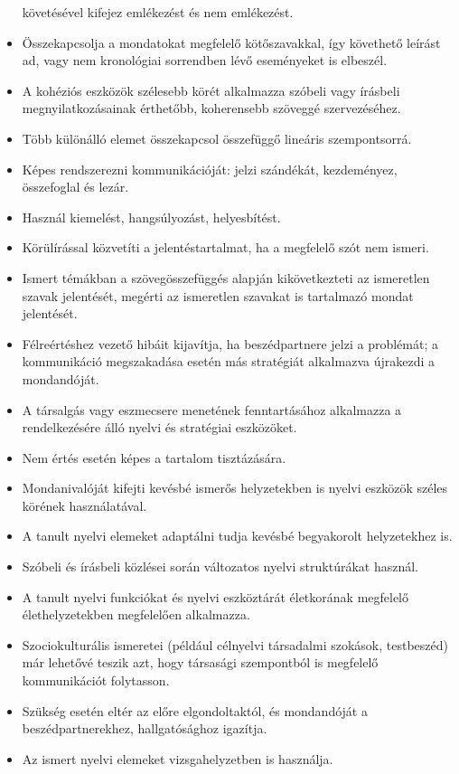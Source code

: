 \begin{itemize}
  követésével kifejez emlékezést és nem emlékezést.
\item
  Összekapcsolja a mondatokat megfelelő kötőszavakkal, így követhető
  leírást ad, vagy nem kronológiai sorrendben lévő eseményeket is
  elbeszél.
\item
  A kohéziós eszközök szélesebb körét alkalmazza szóbeli vagy írásbeli
  megnyilatkozásainak érthetőbb, koherensebb szöveggé szervezéséhez.
\item
  Több különálló elemet összekapcsol összefüggő lineáris szempontsorrá.
\item
  Képes rendszerezni kommunikációját: jelzi szándékát, kezdeményez,
  összefoglal és lezár.
\item
  Használ kiemelést, hangsúlyozást, helyesbítést.
\item
  Körülírással közvetíti a jelentéstartalmat, ha a megfelelő szót nem
  ismeri.
\item
  Ismert témákban a szövegösszefüggés alapján kikövetkezteti az
  ismeretlen szavak jelentését, megérti az ismeretlen szavakat is
  tartalmazó mondat jelentését.
\item
  Félreértéshez vezető hibáit kijavítja, ha beszédpartnere jelzi a
  problémát; a kommunikáció megszakadása esetén más stratégiát
  alkalmazva újrakezdi a mondandóját.
\item
  A társalgás vagy eszmecsere menetének fenntartásához alkalmazza a
  rendelkezésére álló nyelvi és stratégiai eszközöket.
\item
  Nem értés esetén képes a tartalom tisztázására.
\item
  Mondanivalóját kifejti kevésbé ismerős helyzetekben is nyelvi eszközök
  széles körének használatával.
\item
  A tanult nyelvi elemeket adaptálni tudja kevésbé begyakorolt
  helyzetekhez is.
\item
  Szóbeli és írásbeli közlései során változatos nyelvi struktúrákat
  használ.
\item
  A tanult nyelvi funkciókat és nyelvi eszköztárát életkorának megfelelő
  élethelyzetekben megfelelően alkalmazza.
\item
  Szociokulturális ismeretei (például célnyelvi társadalmi szokások,
  testbeszéd) már lehetővé teszik azt, hogy társasági szempontból is
  megfelelő kommunikációt folytasson.
\item
  Szükség esetén eltér az előre elgondoltaktól, és mondandóját a
  beszédpartnerekhez, hallgatósághoz igazítja.
\item
  Az ismert nyelvi elemeket vizsgahelyzetben is használja.

\end{itemize}
